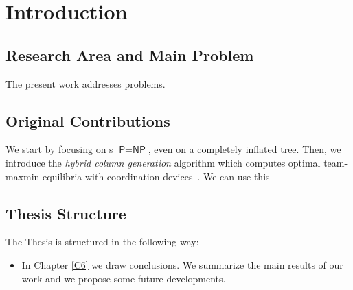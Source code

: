 \chapter{Introduction}

\section{Research Area and Main Problem}

The present work addresses problems.


\section{Original Contributions}
We start by focusing on s $\textsf{P} = \textsf{NP}$, even on a completely inflated tree.
Then, we introduce the \emph{hybrid column generation} algorithm which computes optimal team-maxmin equilibria with coordination devices~\citep{celli18}. We can use this 


\section{Thesis Structure}

The Thesis is structured in the following way:
\begin{itemize}
    \item In Chapter \ref{C6} we draw conclusions. We summarize the main results of our work and we propose some future developments.
\end{itemize}




